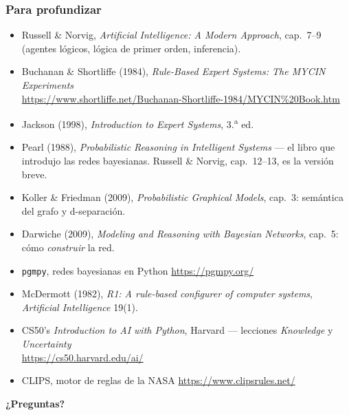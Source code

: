 \documentclass[aspectratio=169, 10pt]{beamer}
\begin{document}
\begin{frame}
\frametitle{Para profundizar}
\footnotesize
\begin{itemize}
	\item Russell \& Norvig, \emph{Artificial Intelligence: A Modern Approach}, cap.~7--9 (agentes l\'ogicos, l\'ogica de primer orden, inferencia).
	\item Buchanan \& Shortliffe (1984), \emph{Rule-Based Expert Systems: The MYCIN Experiments}\\ \url{https://www.shortliffe.net/Buchanan-Shortliffe-1984/MYCIN\%20Book.htm}
	\item Jackson (1998), \emph{Introduction to Expert Systems}, 3.\textsuperscript{a} ed.
	\item Pearl (1988), \emph{Probabilistic Reasoning in Intelligent Systems} --- el libro que introdujo las redes bayesianas. Russell \& Norvig, cap.~12--13, es la versi\'on breve.
	\item Koller \& Friedman (2009), \emph{Probabilistic Graphical Models}, cap.~3: sem\'antica del grafo y d-separaci\'on.
	\item Darwiche (2009), \emph{Modeling and Reasoning with Bayesian Networks}, cap.~5: c\'omo \emph{construir} la red.
	\item \texttt{pgmpy}, redes bayesianas en Python \url{https://pgmpy.org/}
	\item McDermott (1982), \emph{R1: A rule-based configurer of computer systems}, \emph{Artificial Intelligence} 19(1).
	\item CS50's \emph{Introduction to AI with Python}, Harvard --- lecciones \emph{Knowledge} y \emph{Uncertainty}\\ \url{https://cs50.harvard.edu/ai/}
	\item CLIPS, motor de reglas de la NASA \url{https://www.clipsrules.net/}
\end{itemize}
\vspace{0.3em}
\begin{center}
\Large \textbf{¿Preguntas?}
\end{center}
\end{frame}
\end{document}
